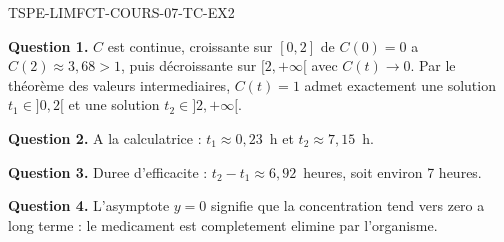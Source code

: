 \begin{corrige}{TSPE-LIMFCT-COURS-07-TC-EX2}

\textbf{Question 1.} $C$ est continue, croissante sur $[0, 2]$ de $C(0) = 0$ a $C(2) \approx 3{,}68 > 1$, puis décroissante sur $[2, +\infty[$ avec $C(t) \to 0$. Par le théorème des valeurs intermediaires, $C(t) = 1$ admet exactement une solution $t_1 \in ]0, 2[$ et une solution $t_2 \in ]2, +\infty[$.

\textbf{Question 2.} A la calculatrice : $t_1 \approx 0{,}23$~h et $t_2 \approx 7{,}15$~h.

\textbf{Question 3.} Duree d'efficacite : $t_2 - t_1 \approx 6{,}92$~heures, soit environ 7 heures.

\textbf{Question 4.} L'asymptote $y = 0$ signifie que la concentration tend vers zero a long terme : le medicament est completement elimine par l'organisme.

\end{corrige}
